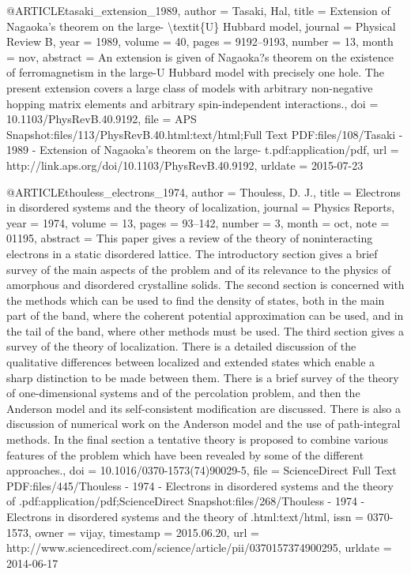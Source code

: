 @ARTICLE{tasaki_extension_1989,
  author = {Tasaki, Hal},
  title = {Extension of {Nagaoka}'s theorem on the large- {\textbackslash}textit\{{U}\}
	{Hubbard} model},
  journal = {Physical Review B},
  year = {1989},
  volume = {40},
  pages = {9192--9193},
  number = {13},
  month = nov,
  abstract = {An extension is given of Nagaoka?s theorem on the existence of ferromagnetism
	in the large-U Hubbard model with precisely one hole. The present
	extension covers a large class of models with arbitrary non-negative
	hopping matrix elements and arbitrary spin-independent interactions.},
  doi = {10.1103/PhysRevB.40.9192},
  file = {APS Snapshot:files/113/PhysRevB.40.html:text/html;Full Text PDF:files/108/Tasaki - 1989 -    Extension of Nagaoka's theorem on the large-    t.pdf:application/pdf},
  url = {http://link.aps.org/doi/10.1103/PhysRevB.40.9192},
  urldate = {2015-07-23}
}

@ARTICLE{thouless_electrons_1974,
  author = {Thouless, D. J.},
  title = {Electrons in disordered systems and the theory of localization},
  journal = {Physics Reports},
  year = {1974},
  volume = {13},
  pages = {93--142},
  number = {3},
  month = oct,
  note = {01195},
  abstract = {This paper gives a review of the theory of noninteracting electrons
	in a static disordered lattice. The introductory section gives a
	brief survey of the main aspects of the problem and of its relevance
	to the physics of amorphous and disordered crystalline solids. The
	second section is concerned with the methods which can be used to
	find the density of states, both in the main part of the band, where
	the coherent potential approximation can be used, and in the tail
	of the band, where other methods must be used. The third section
	gives a survey of the theory of localization. There is a detailed
	discussion of the qualitative differences between localized and extended
	states which enable a sharp distinction to be made between them.
	There is a brief survey of the theory of one-dimensional systems
	and of the percolation problem, and then the Anderson model and its
	self-consistent modification are discussed. There is also a discussion
	of numerical work on the Anderson model and the use of path-integral
	methods. In the final section a tentative theory is proposed to combine
	various features of the problem which have been revealed by some
	of the different approaches.},
  doi = {10.1016/0370-1573(74)90029-5},
  file = {ScienceDirect Full Text PDF:files/445/Thouless - 1974 - Electrons in disordered systems and the theory of .pdf:application/pdf;ScienceDirect Snapshot:files/268/Thouless - 1974 - Electrons in disordered systems and the theory of .html:text/html},
  issn = {0370-1573},
  owner = {vijay},
  timestamp = {2015.06.20},
  url = {http://www.sciencedirect.com/science/article/pii/0370157374900295},
  urldate = {2014-06-17}
}


